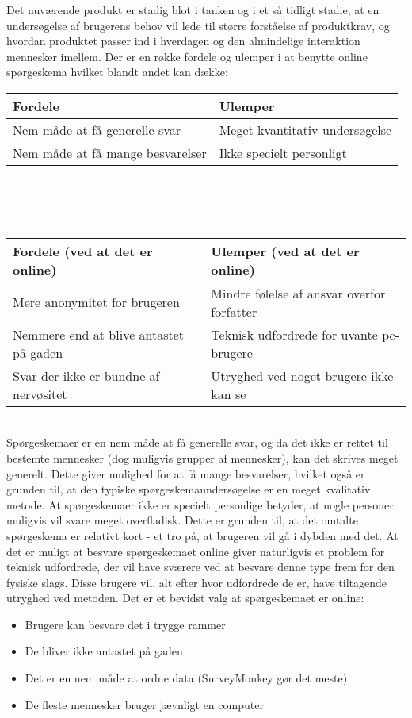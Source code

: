 \documentclass{article}
\begin{document}
    Det nuværende produkt er stadig blot i tanken og i et så tidligt stadie, at en undersøgelse af brugerens behov vil lede til større forståelse af produktkrav, og hvordan produktet passer ind i hverdagen og den almindelige interaktion mennesker imellem. Der er en røkke fordele og ulemper i at benytte online spørgeskema hvilket  blandt andet kan dække:\\
\begin{tabular}{ | l | l | }
    \hline
    \textbf{Fordele} & \textbf{Ulemper} \\ \hline
    Nem måde at få generelle svar & Meget kvantitativ undersøgelse \\ \hline
    Nem måde at få mange besvarelser & Ikke specielt personligt \\
    \hline
\end{tabular}\\
\\
\\
\begin{tabular}{ | l | l | }
    \hline
    \textbf{Fordele (ved at det er online)} & \textbf{Ulemper (ved at det er online)} \\ \hline
    Mere anonymitet for brugeren & Mindre følelse af ansvar overfor forfatter \\ \hline
    Nemmere end at blive antastet på gaden & Teknisk udfordrede for uvante pc-brugere \\ \hline
    Svar der ikke er bundne af nervøsitet & Utryghed ved noget brugere ikke kan se \\ \hline
\end{tabular}\\
    
    Spørgeskemaer er en nem måde at få generelle svar, og da det ikke er rettet til bestemte mennesker (dog muligvis grupper af mennesker), kan det skrives meget generelt. Dette giver mulighed for at få mange besvarelser, hvilket også er grunden til, at den typiske spørgeskemaundersøgelse er en meget kvalitativ metode. At spørgeskemaer ikke er specielt personlige betyder, at nogle personer muligvis vil svare meget overfladisk. Dette er grunden til, at det omtalte spørgeskema er relativt kort - et tro på, at brugeren vil gå i dybden med det. At det er muligt at besvare spørgeskemaet online giver naturligvis et problem for teknisk udfordrede, der vil have sværere ved at besvare denne type frem for den fysiske slags. Disse brugere vil, alt efter hvor udfordrede de er, have tiltagende utryghed ved metoden. Det er et bevidst valg at spørgeskemaet er online:
\begin{itemize}

  \item Brugere kan besvare det i trygge rammer
  \item De bliver ikke antastet på gaden
  \item Det er en nem måde at ordne data (SurveyMonkey gør det meste)
  \item De fleste mennesker bruger jævnligt en computer

\end{itemize}
\end{document}

